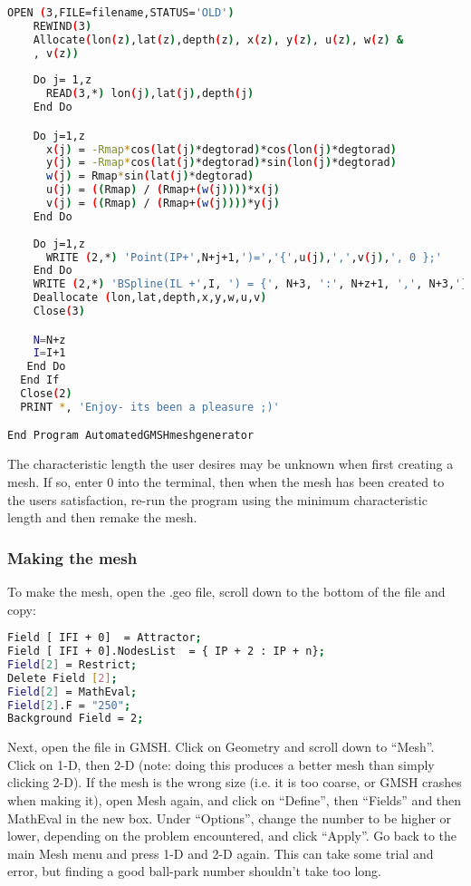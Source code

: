\begin{lstlisting}[language = Bash]
    OPEN (3,FILE=filename,STATUS='OLD')
    REWIND(3)
    Allocate(lon(z),lat(z),depth(z), x(z), y(z), u(z), w(z) &
    , v(z))
       
    Do j= 1,z
      READ(3,*) lon(j),lat(j),depth(j)
    End Do

    Do j=1,z
      x(j) = -Rmap*cos(lat(j)*degtorad)*cos(lon(j)*degtorad)
      y(j) = -Rmap*cos(lat(j)*degtorad)*sin(lon(j)*degtorad)
      w(j) = Rmap*sin(lat(j)*degtorad)
      u(j) = ((Rmap) / (Rmap+(w(j))))*x(j)
      v(j) = ((Rmap) / (Rmap+(w(j))))*y(j)
    End Do
  
    Do j=1,z
      WRITE (2,*) 'Point(IP+',N+j+1,')=','{',u(j),',',v(j),', 0 };'
    End Do
    WRITE (2,*) 'BSpline(IL +',I, ') = {', N+3, ':', N+z+1, ',', N+3,'};'
    Deallocate (lon,lat,depth,x,y,w,u,v)
    Close(3)

    N=N+z 
    I=I+1
   End Do
  End If
  Close(2)
  PRINT *, 'Enjoy- its been a pleasure ;)'

End Program AutomatedGMSHmeshgenerator
\end{lstlisting}

The characteristic length the user desires may be unknown when first creating a mesh. If so, enter 0 into the terminal, 
then when the mesh has been created to the users satisfaction, re-run the program using the minimum characteristic length 
and then remake the mesh.

\subsubsection{Making the mesh}

To make the mesh, open the .geo file, scroll down to the bottom of the file and copy:

\begin{lstlisting}[language = Bash]
Field [ IFI + 0]  = Attractor; 
Field [ IFI + 0].NodesList  = { IP + 2 : IP + n}; 
Field[2] = Restrict; 
Delete Field [2]; 
Field[2] = MathEval; 
Field[2].F = "250"; 
Background Field = 2; 
\end{lstlisting}

Next, open the file in GMSH. Click on Geometry and scroll down to “Mesh”. Click on 1-D, then 2-D (note: doing 
this produces a better mesh than simply clicking 2-D). If the mesh is the wrong size (i.e. it is too coarse, or 
GMSH crashes when making it), open Mesh again, and click on “Define”, then “Fields” and then MathEval in the new box.
Under “Options”, change the number to be higher or lower, depending on the problem encountered, and click “Apply”.  Go back to the
main Mesh menu and press 1-D and 2-D again. This can take some trial and error, but finding a good ball-park number
shouldn't take too long. 

